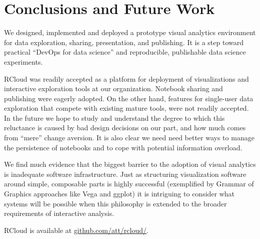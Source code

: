\section{Conclusions and Future Work}
We designed, implemented and deployed a prototype visual analytics environment
for data exploration, sharing, presentation, and publishing. It is a step toward
practical ``DevOps for data science'' and reproducible, publishable data
science experiments.

RCloud was readily accepted as a platform for deployment of
visualizations and interactive exploration tools at our organization.  
Notebook sharing and publishing were eagerly adopted.
On the other hand, features for single-user data exploration that
compete with existing mature tools, were not readily accepted.
In the future we hope to study and understand the degree to which
this reluctance is caused by bad design decisions on our part, and how
much comes from ``mere'' change aversion. It is also clear we need
need better ways to manage the persistence of notebooks and to cope
with potential information overload.

We find much evidence that the biggest barrier to the adoption of
visual analytics is inadequate software infrastructure.
Just as structuring visualization software around simple,
composable parts is highly successful (exemplified by
Grammar of Graphics approaches like Vega and ggplot)
it is intriguing to consider what systems will be
possible when this philosophy is extended to the
broader requirements of interactive analysis.

RCloud is available at \url{github.com/att/rcloud/}.
